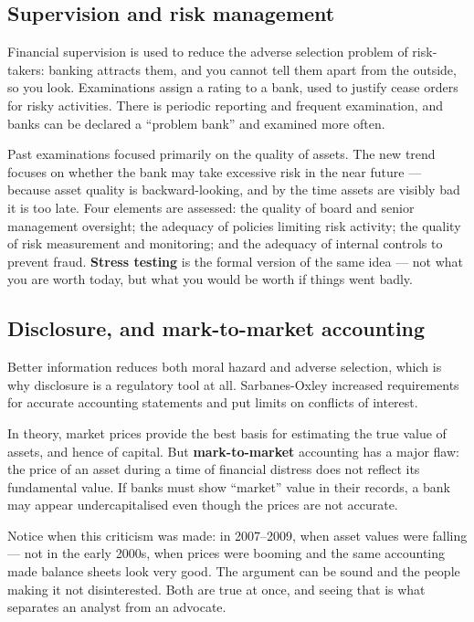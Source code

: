\documentclass[11pt,a4paper]{article}
\begin{document}
\subsection*{Supervision and risk management}

Financial supervision is used to reduce the adverse selection problem of
risk-takers: banking attracts them, and you cannot tell them apart from the
outside, so you look. Examinations assign a rating to a bank, used to justify
cease orders for risky activities. There is periodic reporting and frequent
examination, and banks can be declared a ``problem bank'' and examined more
often.

Past examinations focused primarily on the quality of assets. The new trend
focuses on whether the bank may take excessive risk in the near future ---
because asset quality is backward-looking, and by the time assets are visibly
bad it is too late. Four elements are assessed: the quality of board and senior
management oversight; the adequacy of policies limiting risk activity; the
quality of risk measurement and monitoring; and the adequacy of internal
controls to prevent fraud. \textbf{Stress testing} is the formal version of the
same idea --- not what you are worth today, but what you would be worth if
things went badly.

\subsection*{Disclosure, and mark-to-market accounting}

Better information reduces both moral hazard and adverse selection, which is why
disclosure is a regulatory tool at all. Sarbanes-Oxley increased requirements
for accurate accounting statements and put limits on conflicts of interest.

In theory, market prices provide the best basis for estimating the true value of
assets, and hence of capital. But \textbf{mark-to-market} accounting has a major
flaw: the price of an asset during a time of financial distress does not reflect
its fundamental value. If banks must show ``market'' value in their records, a
bank may appear undercapitalised even though the prices are not accurate.

Notice when this criticism was made: in 2007--2009, when asset values were
falling --- not in the early 2000s, when prices were booming and the same
accounting made balance sheets look very good. The argument can be sound and the
people making it not disinterested. Both are true at once, and seeing that is
what separates an analyst from an advocate.
\end{document}

